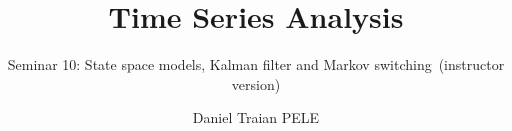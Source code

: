 \title[Time Series Analysis]{Time Series Analysis}
\subtitle{Seminar 10: State space models, Kalman filter and Markov switching\ifsolutions\ (instructor version)\fi}
\author[D.T. Pele]{Daniel Traian PELE}
\date{}

\providecommand{\tsaapplink}[3]{\hypertarget{#2}{}\hyperlink{#1}{\beamergotobutton{#3}}}  %
\providecommand{\tsaappback}[2]{\begin{tikzpicture}[remember picture,overlay]\node[anchor=south east] at ([xshift=-3mm,yshift=7mm]current page.south east){\hyperlink{#1}{\beamerreturnbutton{#2}}};\end{tikzpicture}}  %
\providecommand{\tsachlink}[2]{\href{#1}{#2}}  %
\providecommand{\tsachlinkt}[2]{\href{#1}{\usebeamercolor[fg]{frametitle}#2}}  %


